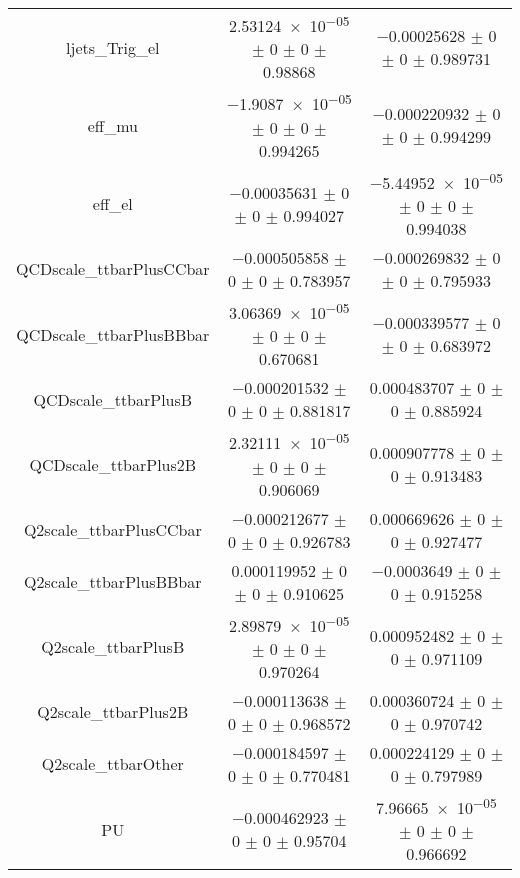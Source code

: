 \begin{table}
\begin{tabular}{ccc}
ljets\_Trig\_el 	& \num{2.53124e-05} $\pm$ \num{0} $\pm$ \num{0} $\pm$ \num{0.98868} 	& \num{-0.00025628} $\pm$ \num{0} $\pm$ \num{0} $\pm$ \num{0.989731}\\
eff\_mu 	& \num{-1.9087e-05} $\pm$ \num{0} $\pm$ \num{0} $\pm$ \num{0.994265} 	& \num{-0.000220932} $\pm$ \num{0} $\pm$ \num{0} $\pm$ \num{0.994299}\\
eff\_el 	& \num{-0.00035631} $\pm$ \num{0} $\pm$ \num{0} $\pm$ \num{0.994027} 	& \num{-5.44952e-05} $\pm$ \num{0} $\pm$ \num{0} $\pm$ \num{0.994038}\\
QCDscale\_ttbarPlusCCbar 	& \num{-0.000505858} $\pm$ \num{0} $\pm$ \num{0} $\pm$ \num{0.783957} 	& \num{-0.000269832} $\pm$ \num{0} $\pm$ \num{0} $\pm$ \num{0.795933}\\
QCDscale\_ttbarPlusBBbar 	& \num{3.06369e-05} $\pm$ \num{0} $\pm$ \num{0} $\pm$ \num{0.670681} 	& \num{-0.000339577} $\pm$ \num{0} $\pm$ \num{0} $\pm$ \num{0.683972}\\
QCDscale\_ttbarPlusB 	& \num{-0.000201532} $\pm$ \num{0} $\pm$ \num{0} $\pm$ \num{0.881817} 	& \num{0.000483707} $\pm$ \num{0} $\pm$ \num{0} $\pm$ \num{0.885924}\\
QCDscale\_ttbarPlus2B 	& \num{2.32111e-05} $\pm$ \num{0} $\pm$ \num{0} $\pm$ \num{0.906069} 	& \num{0.000907778} $\pm$ \num{0} $\pm$ \num{0} $\pm$ \num{0.913483}\\
Q2scale\_ttbarPlusCCbar 	& \num{-0.000212677} $\pm$ \num{0} $\pm$ \num{0} $\pm$ \num{0.926783} 	& \num{0.000669626} $\pm$ \num{0} $\pm$ \num{0} $\pm$ \num{0.927477}\\
Q2scale\_ttbarPlusBBbar 	& \num{0.000119952} $\pm$ \num{0} $\pm$ \num{0} $\pm$ \num{0.910625} 	& \num{-0.0003649} $\pm$ \num{0} $\pm$ \num{0} $\pm$ \num{0.915258}\\
Q2scale\_ttbarPlusB 	& \num{2.89879e-05} $\pm$ \num{0} $\pm$ \num{0} $\pm$ \num{0.970264} 	& \num{0.000952482} $\pm$ \num{0} $\pm$ \num{0} $\pm$ \num{0.971109}\\
Q2scale\_ttbarPlus2B 	& \num{-0.000113638} $\pm$ \num{0} $\pm$ \num{0} $\pm$ \num{0.968572} 	& \num{0.000360724} $\pm$ \num{0} $\pm$ \num{0} $\pm$ \num{0.970742}\\
Q2scale\_ttbarOther 	& \num{-0.000184597} $\pm$ \num{0} $\pm$ \num{0} $\pm$ \num{0.770481} 	& \num{0.000224129} $\pm$ \num{0} $\pm$ \num{0} $\pm$ \num{0.797989}\\
PU 	& \num{-0.000462923} $\pm$ \num{0} $\pm$ \num{0} $\pm$ \num{0.95704} 	& \num{7.96665e-05} $\pm$ \num{0} $\pm$ \num{0} $\pm$ \num{0.966692}\\

\end{tabular}
\end{table}
